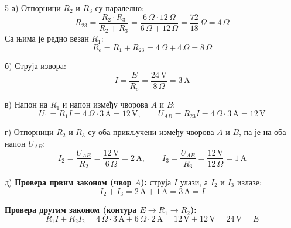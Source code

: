 \documentclass[12pt]{article}
\begin{document}
\begin{resenje}{5}
а) Отпорници $R_2$ и $R_3$ су паралелно:
\[
R_{23} = \frac{R_2 \cdot R_3}{R_2 + R_3}
       = \frac{6\,\Omega \cdot 12\,\Omega}{6\,\Omega + 12\,\Omega}
       = \frac{72}{18}\,\Omega = 4\,\Omega
\]
Са њима је редно везан $R_1$:
\[
R_e = R_1 + R_{23} = 4\,\Omega + 4\,\Omega = 8\,\Omega
\]

б) Струја извора:
\[
I = \frac{E}{R_e} = \frac{24\,\text{V}}{8\,\Omega} = 3\,\text{A}
\]

в) Напон на $R_1$ и напон између чворова $A$ и $B$:
\[
U_1 = R_1 I = 4\,\Omega \cdot 3\,\text{A} = 12\,\text{V}, \qquad
U_{AB} = R_{23} I = 4\,\Omega \cdot 3\,\text{A} = 12\,\text{V}
\]

г) Отпорници $R_2$ и $R_3$ су оба прикључени између чворова $A$ и $B$, па је
на оба напон $U_{AB}$:
\[
I_2 = \frac{U_{AB}}{R_2} = \frac{12\,\text{V}}{6\,\Omega} = 2\,\text{A}, \qquad
I_3 = \frac{U_{AB}}{R_3} = \frac{12\,\text{V}}{12\,\Omega} = 1\,\text{A}
\]

д) \textbf{Провера првим законом (чвор $A$):} струја $I$ улази, а $I_2$ и
$I_3$ излазе:
\[
I_2 + I_3 = 2\,\text{A} + 1\,\text{A} = 3\,\text{A} = I
\]

\textbf{Провера другим законом (контура $E \to R_1 \to R_2$):}
\[
R_1 I + R_2 I_2 = 4\,\Omega \cdot 3\,\text{A} + 6\,\Omega \cdot 2\,\text{A}
= 12\,\text{V} + 12\,\text{V} = 24\,\text{V} = E
\]
\end{resenje}
\end{document}
